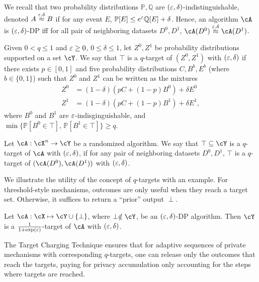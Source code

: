 We recall that two probability distributions $\mathbb{P},\mathbb{Q}$ are $(\varepsilon,\delta)$-indistinguishable, denoted $A\stackrel{\varepsilon,\delta}{\approx} B$ if for any event $E$, $\mathbb{P}[E]\leq e^{\varepsilon}\mathbb{Q}[E]+\delta$. Hence, an algorithm $\cA$ is $(\varepsilon,\delta)$-DP iff for all pair of neighboring datasets $D^0,D^1$, $\cA(D^0)\stackrel{\eps,\delta}{\approx}\cA(D^1)$.

\begin{definition}
Given $0< q\leq 1$ and $\varepsilon\geq 0$, $0\leq \delta\leq 1$, 
let $Z^0,Z^1$ be probability distributions supported on a set $\cY$. We say that $\top$ is a $q$-target of $(Z^0,Z^1)$ with $(\varepsilon,\delta)$ if there exists $p\in[0,1]$ and five probability distributions $C,B^b,E^b$ (where $b\in\{0,1\}$) such that $Z^0$ and $Z^1$ can be written as the mixtures
\begin{align*}
Z^0 &= (1-\delta)(p C+(1-p)B^0)+\delta E^0\\
Z^1 &= (1-\delta)(p C+(1-p)B^1)+\delta E^1,
\end{align*}
where $B^0$ and $B^1$ are $\varepsilon$-indisginguishable, and $\min\{\mathbb{P}[B^0\in \top],\, \mathbb{P}[B^1\in \top]\} \geq q$.

Let $\cA:\cX^n \to \cY$ be a randomized algorithm. We say that $\top\subseteq \cY$ is a $q$-target of $\cA$ with $(\varepsilon,\delta)$, if for any pair of neighboring datasets $D^0,D^1$, $\top$ is a $q$-target of $(\cA(D^0),\cA(D^1))$ with $(\varepsilon,\delta)$.
\end{definition}

We illustrate the utility of the concept of $q$-targets with an example. 
For threshold-style mechanisms, outcomes are only useful when they reach a target set. Otherwise, it suffices to return a ``prior'' output $\perp$. 

\begin{lemma}
\label{lem:target}
Let $\cA:\cX\mapsto\cY\cup\{\perp\}$, where $\perp\notin\cY$, be an $(\varepsilon,\delta)$-DP algorithm. Then $\cY$ is a $\frac{1}{1+\exp(\varepsilon)}$-target of $\cA$ with $(\varepsilon,\delta)$.
\end{lemma}



The Target Charging Technique ensures that for adaptive sequences of private mechanisms with corresponding $q$-targets, one can release only the outcomes that reach the targets, paying for privacy accumulation only accounting for the steps where targets are reached.

